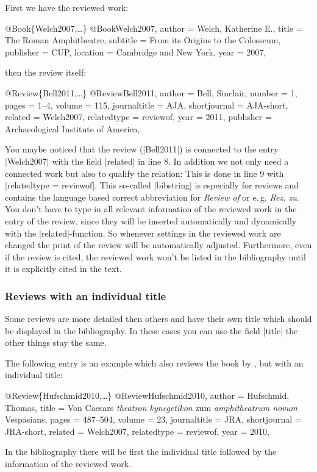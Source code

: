 \documentclass[a4paper,
10pt,
greek,
french,
spanish,
italian,
ngerman,
english
]{ltxdoc}
\begin{document}
First we have the reviewed work:
\begin{bibexample}[label=Welch2007]{{@}Book\{Welch2007,…\}}
@Book{Welch2007,
  author    = {Welch, Katherine E.},
  title     = {The {Roman} Amphitheatre},
  subtitle  = {From its Origins to the Colosseum},
  publisher = CUP,    %
  location  = {Cambridge and New York},
  year      = {2007},
}
\end{bibexample}
then the review itself:
\begin{bibexample}[label=Bell2011]{{@}Review\{Bell2011,…\}}
@Review{Bell2011,
  author       = {Bell, Sinclair},
  number       = {1},
  pages        = {1--4},
  volume       = {115},
  journaltitle = AJA,    %
  shortjournal = AJA-short,    %
  related      = {Welch2007},
  relatedtype  = {reviewof},
  year         = {2011},
  publisher    = {Archaeological Institute of America},
}
\end{bibexample}
You maybe noticed that the review (|Bell2011|) is connected to the entry |Welch2007| with the field |related| in line 8.
In addition we not only need a connected work but also to qualify the relation:
This is done in line 9 with |relatedtype = {reviewof}|.
This so-called |bibstring| is especially for reviews and contains the language based correct abbreviation for \emph{Review of} or e.\,g. \emph{Rez. zu}.
You don’t have to type in all relevant information of the reviewed work in the entry of the review, 
since they will be inserted automatically and dynamically with the  |related|-function. 
So whenever settings in the reviewed work are changed the print of the review will be automatically adjusted. 
Furthermore, even if the review is cited, the reviewed work won't be listed in the bibliography until it is explicitly cited in the text.


\subsubsection{Reviews with an individual title}
Some reviews are more detailed then others and  have their own title which should be displayed in the bibliography.
In these cases you can use the field |title| the other things stay the same.

The following entry is an example which also reviews the book by \citeauthor*{Welch2007},  but with an individual title:
\begin{bibexample}[label=Hufschmid2010]{{@}Review\{Hufschmid2010,…\}}
@Review{Hufschmid2010,
  author       = {Hufschmid, Thomas},
  title        = {Von Caesars \emph{theatron kynegetikon} zum \emph{amphitheatrum novum} Vespasians},
  pages        = {487--504},
  volume       = {23},
  journaltitle = JRA,    %
  shortjournal = JRA-short,    %
  related      = {Welch2007},
  relatedtype  = {reviewof},
  year         = {2010},
}
\end{bibexample}
In the bibliography there will be first the individual title followed by the information of the reviewed work.
\end{document}
